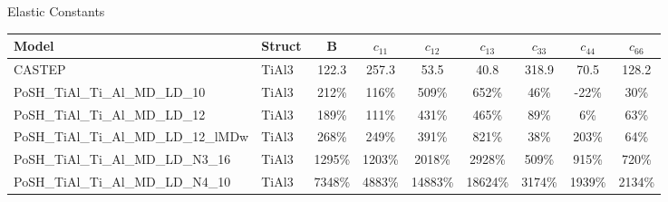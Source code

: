 \documentclass[preview]{standalone}
\begin{document}
\begin{center}
\textnormal{Elastic Constants} \\
\vspace{2mm}
\begin{tabular}{ l l c c c c c c c } \toprule 
Model & Struct & B & $c_{11}$ & $c_{12}$ & $c_{13}$ & $c_{33}$ & $c_{44}$ & $c_{66}$\\ \midrule 
CASTEP & TiAl3 & 122.3 & 257.3 & 53.5 & 40.8 & 318.9 & 70.5 & 128.2\\ 
PoSH\_TiAl\_Ti\_Al\_MD\_LD\_10 & TiAl3 & 212\% & 116\% & 509\% & 652\% & 46\% & -22\% & 30\%\\ 
PoSH\_TiAl\_Ti\_Al\_MD\_LD\_12 & TiAl3 & 189\% & 111\% & 431\% & 465\% & 89\% & 6\% & 63\%\\ 
PoSH\_TiAl\_Ti\_Al\_MD\_LD\_12\_lMDw & TiAl3 & 268\% & 249\% & 391\% & 821\% & 38\% & 203\% & 64\%\\ 
PoSH\_TiAl\_Ti\_Al\_MD\_LD\_N3\_16 & TiAl3 & 1295\% & 1203\% & 2018\% & 2928\% & 509\% & 915\% & 720\%\\ 
PoSH\_TiAl\_Ti\_Al\_MD\_LD\_N4\_10 & TiAl3 & 7348\% & 4883\% & 14883\% & 18624\% & 3174\% & 1939\% & 2134\%\\ 
\end{tabular} \bigskip 
\end{center}
\end{document}
